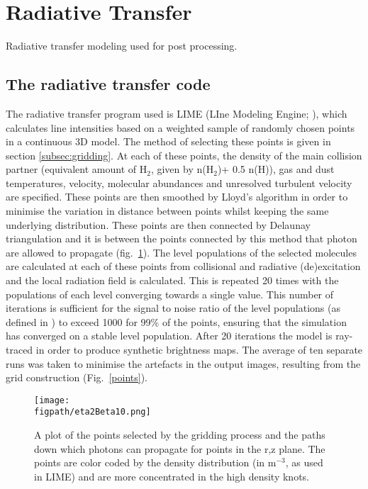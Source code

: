 \documentclass[useAMS,usenatbib,letters]{mn2e}
\newcommand{\figpath}{PFIGS/}
\begin{document}
\section{Radiative Transfer}
Radiative transfer modeling used for post processing.

\subsection{The radiative transfer code} \label{subsec:radiative_transfer_code}
The radiative transfer program used is LIME (LIne Modeling Engine; \citealt{Brinch:2010p13078}), which  calculates line intensities based on a weighted sample of randomly chosen points in a continuous 3D model. The method of selecting these points is given in section \ref{subsec:gridding}. At each of these points, the density of the main collision partner (equivalent amount of H$_2$, given by n(H$_2$)+ 0.5 n(H)), gas and dust temperatures, velocity, molecular abundances and unresolved turbulent velocity are specified. These points are then smoothed by Lloyd's algorithm \citep{Lloyd1982} in order to minimise the variation in distance between points whilst keeping the same underlying distribution. These points are then connected by Delaunay triangulation and it is between the points connected by this method that photon are allowed to propagate (fig.~\ref{grid}). The level populations of the selected molecules are calculated at each of these points from collisional and radiative (de)excitation and the local radiation field is calculated. This is repeated 20 times with the populations of each level converging towards a single value. This number of iterations is sufficient for the signal to noise ratio of the level populations (as defined in \citealt{Brinch:2010p13078}) to exceed 1000 for 99\% of the points, ensuring that the simulation has converged on a stable level population. After 20 iterations the model is ray-traced in order to produce synthetic brightness maps. The average of ten separate runs was taken to minimise the artefacts in the output images, resulting from the grid construction (Fig.~\ref{points}).


\begin{figure}
 \texttt{[image: \\figpath/eta2Beta10.png]}
 \caption{A plot of the points selected by the gridding process and the paths down which photons can propagate for points in the r,z plane. The points are color coded by the density distribution (in m$^{-3}$, as used in LIME) and are more concentrated in the high density knots.}
\label{grid}
\end{figure}
\end{document}

